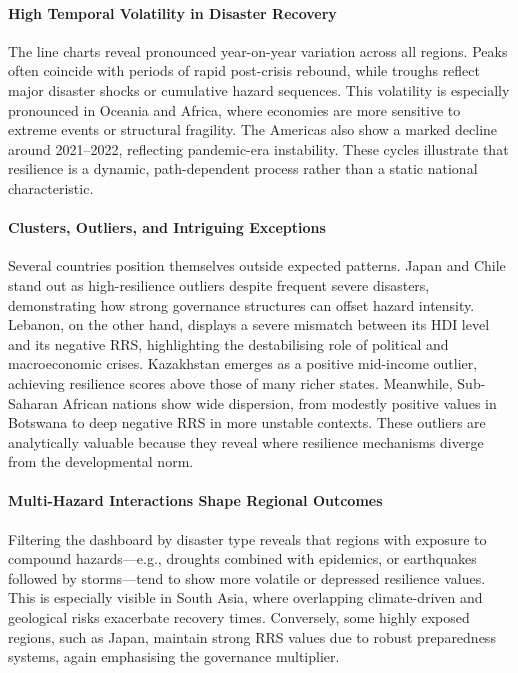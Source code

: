\documentclass[conference]{IEEEtran}
\begin{document}
\paragraph{High Temporal Volatility in Disaster Recovery}
The line charts reveal pronounced year-on-year variation across all regions. Peaks often coincide with periods of rapid post-crisis rebound, while troughs reflect major disaster shocks or cumulative hazard sequences. This volatility is especially pronounced in Oceania and Africa, where economies are more sensitive to extreme events or structural fragility. The Americas also show a marked decline around 2021–2022, reflecting pandemic-era instability. These cycles illustrate that resilience is a dynamic, path-dependent process rather than a static national characteristic.

\paragraph{Clusters, Outliers, and Intriguing Exceptions}
Several countries position themselves outside expected patterns. Japan and Chile stand out as high-resilience outliers despite frequent severe disasters, demonstrating how strong governance structures can offset hazard intensity. Lebanon, on the other hand, displays a severe mismatch between its HDI level and its negative RRS, highlighting the destabilising role of political and macroeconomic crises. Kazakhstan emerges as a positive mid-income outlier, achieving resilience scores above those of many richer states. Meanwhile, Sub-Saharan African nations show wide dispersion, from modestly positive values in Botswana to deep negative RRS in more unstable contexts. These outliers are analytically valuable because they reveal where resilience mechanisms diverge from the developmental norm.

\paragraph{Multi-Hazard Interactions Shape Regional Outcomes}
Filtering the dashboard by disaster type reveals that regions with exposure to compound hazards—e.g., droughts combined with epidemics, or earthquakes followed by storms—tend to show more volatile or depressed resilience values. This is especially visible in South Asia, where overlapping climate-driven and geological risks exacerbate recovery times. Conversely, some highly exposed regions, such as Japan, maintain strong RRS values due to robust preparedness systems, again emphasising the governance multiplier.
\end{document}

